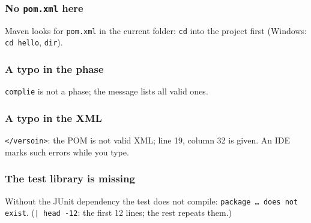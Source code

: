 \documentclass[aspectratio=169,10pt,compress]{beamer}
\begin{document}
\begin{frame}[t,fragile] \frametitle{No \texttt{pom.xml} here}

  \vspace{0.1em}
  \small
  Maven looks for \texttt{pom.xml} in the current folder: \texttt{cd} into the project first (Windows: \texttt{cd hello}, \texttt{dir}).
\end{frame}




\begin{frame}[t,fragile] \frametitle{A typo in the phase}

  \vspace{0.1em}
  \small
  \texttt{complie} is not a phase; the message lists all valid ones.
\end{frame}




\begin{frame}[t,fragile] \frametitle{A typo in the XML}

  \vspace{0.1em}
  \small
  \texttt{</versoin>}: the POM is not valid XML; line 19, column 32 is given. An IDE marks such errors while you type.
\end{frame}




\begin{frame}[t,fragile] \frametitle{The test library is missing}

  \vspace{0.1em}
  \small
  Without the JUnit dependency the test does not compile: \texttt{package \dots\ does not exist}. (\texttt{| head -12}: the first 12 lines; the rest repeats them.)
\end{frame}

\end{document}
